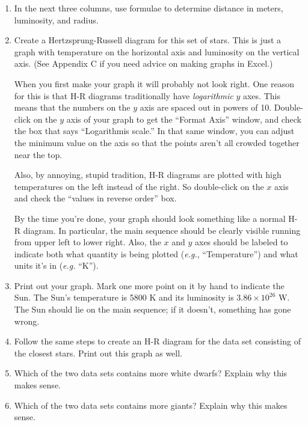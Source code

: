 \begin{enumerate}
\item In the next three columns, use formulae to determine distance
in meters, luminosity, and radius.  

\item Create a Hertzsprung-Russell diagram for this set of stars.
This is just a graph with temperature on the horizontal axis and
luminosity on the vertical axis.  (See Appendix C if you need
advice on making graphs in Excel.)  

When you first make your graph
it will probably not look right.  One reason for this is that H-R diagrams
traditionally have {\it logarithmic} $y$ axes.  This means that
the numbers on the $y$ axis are spaced out in powers of 10.  
Double-click on the $y$ axis of your graph to get the ``Format Axis''
window, and check the box that says ``Logarithmis scale.''
In
that same window, you can
adjust the minimum value on the axis so that the points aren't all
crowded together near the top.

Also, by annoying, stupid tradition, H-R diagrams are plotted with
high temperatures on the left instead of the right.  So double-click
on the $x$ axis and check the ``values in reverse order'' box.

By the time you're done, your graph should look something like a
normal H-R diagram.  In particular, the main sequence should be clearly
visible running from upper left to lower right.  Also, the $x$ and $y$ 
axes should be labeled to indicate both what quantity
is being plotted ({\it e.g.}, ``Temperature'') and what units it's
in ({\it e.g.} ``K'').

\item Print out your graph.  Mark one more point on it by hand
to indicate the Sun.  The Sun's temperature is 5800 K and its
luminosity is $3.86\times 10^{26}$ W.  The Sun should lie
on the main sequence; if it doesn't, something has gone wrong.

\item Follow the same steps to create an H-R diagram for the data
set consisting of the closest stars.  Print out this graph as well.

\item Which of the two data sets contains more white dwarfs?
Explain why this makes sense.

\vskip 1in

\item Which of the two data sets contains more giants?  Explain why
this makes sense.

\vskip 1in


\end{enumerate}

